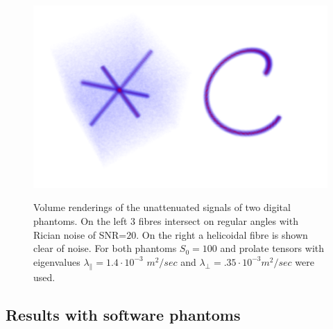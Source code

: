 \documentclass{bioinfo}
\begin{document}
%
\begin{figure}
\begin{centering}
\includegraphics[scale=0.6]{figures/digital_phantom}
\par\end{centering}

\caption{Volume renderings of the unattenuated signals of two digital phantoms.
On the left 3 fibres intersect on regular angles with Rician noise
of SNR=$20$. On the right a helicoidal fibre is shown clear of noise.
For both phantoms $S_{0}=100$ and prolate tensors with eigenvalues
$\lambda_{\parallel}=1.4\cdot10^{-3}$ \foreignlanguage{british}{$m^{2}/sec$}
and $\lambda_{\perp}=.35\cdot10^{-3}m^{2}/sec$ were used.}


\centering{}\label{Flo:cool_phantoms}
\end{figure}



\subsection{Results with software phantoms}
\end{document}
